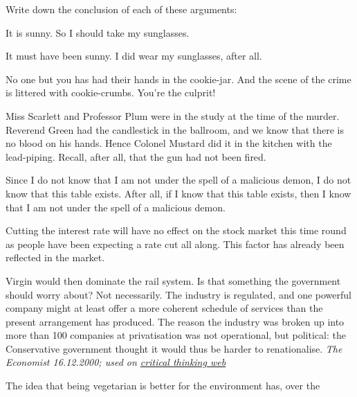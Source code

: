 \begin{practiceproblems}
\problempart
Write down the conclusion of each of these arguments:
\begin{earg}
	\item It is sunny. So I should take my sunglasses.
	\item It must have been sunny. I did wear my sunglasses, after all.
	\item No one but you has had their hands in the cookie-jar. And the scene of the crime is littered with cookie-crumbs. You're the culprit!
	\item Miss Scarlett and Professor Plum were in the study at the time of the murder. Reverend Green had the candlestick in the ballroom, and we know that there is no blood on his hands. Hence Colonel Mustard did it in the kitchen with the lead-piping. Recall, after all, that the gun had not been fired.
	\item  Since I do not know that I am not under the spell of a malicious demon, I do not know that this table exists. After all, if I know that this table exists, then I know that I am not under the spell of a malicious demon.
	\item Cutting the interest rate will have no effect on the stock market this time round as people have been expecting a rate cut all along. This factor has already been reflected in the market.
	\item Virgin would then dominate the rail system. Is that something the government should worry about? Not necessarily. The industry is regulated, and one powerful company might at least offer a more coherent schedule of services than the present arrangement has produced. The reason the industry was broken up into more than 100 companies at privatisation was not operational, but political: the Conservative government thought it would thus be harder to renationalise. \emph{The Economist 16.12.2000; used on \href{https://philosophy.hku.hk/think/arg/arg.php}{critical thinking web}}
	\item The idea that being vegetarian is better for the environment has, over the

\end{earg}
\end{practiceproblems}
